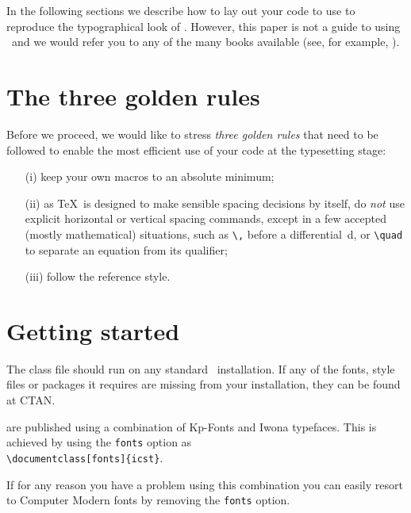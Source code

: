 \documentclass[fonts]{icst}
\begin{document}
In the following sections we describe how to lay out your code to
use \textsf{\journalclass} to reproduce the typographical look of
\emph{\journalnamelc}. However, this paper is not a guide to
using \LaTeXe\ and we would refer you to any of the many books
available (see, for example, \cite{R1,R2,R3}).

\section{The three golden rules}
Before we proceed, we would like to stress \emph{three golden
rules} that need to be followed to enable the most efficient use
of your code at the typesetting stage:
\begin{enumerate}
\item[(i)] keep your own macros to an absolute minimum;

\item[(ii)] as \TeX\ is designed to make sensible spacing
decisions by itself, do \emph{not} use explicit horizontal or
vertical spacing commands, except in a few accepted (mostly
mathematical) situations, such as \verb"\," before a
differential~d, or \verb"\quad" to separate an equation from its
qualifier;

\item[(iii)] follow the \emph{\journalnamelc} reference style.
\end{enumerate}

\section{Getting started}
The \textsf{\journalclassshort} class file should run
on any standard \LaTeXe\ installation. If any of the fonts, style
files or packages it requires are missing from your installation,
they can be found at CTAN.

\emph{\journalnamelc} are published using a combination of Kp-Fonts
and Iwona typefaces. This is achieved by using the \verb"fonts"
option as\\
\verb"\documentclass[fonts]{icst}".

\noindent If for any reason you have a problem using this
combination you can easily resort to Computer Modern fonts by
removing the \verb"fonts" option.
\end{document}
